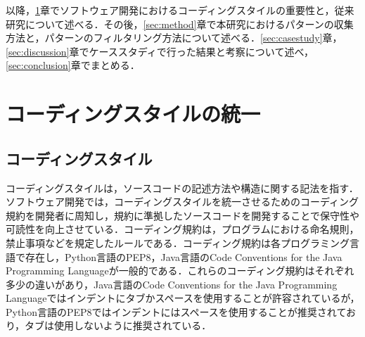 \documentclass[T,J]{fose} %
\begin{document}
以降，\ref{sec:union}章でソフトウェア開発におけるコーディングスタイルの重要性と，従来研究について述べる．その後，\ref{sec:method}章で本研究におけるパターンの収集方法と，パターンのフィルタリング方法について述べる．\ref{sec:casestudy}章，\ref{sec:discussion}章でケーススタディで行った結果と考察について述べ，\ref{sec:conclusion}章でまとめる．

\section{コーディングスタイルの統一}\label{sec:union}

\subsection{コーディングスタイル}
コーディングスタイルは，ソースコードの記述方法や構造に関する記法を指す．ソフトウェア開発では，コーディングスタイルを統一させるためのコーディング規約を開発者に周知し，規約に準拠したソースコードを開発することで保守性や可読性を向上させている．\cite{AnalysisoftheTools}コーディング規約は，プログラムにおける命名規則，禁止事項などを規定したルールである．コーディング規約は各プログラミング言語で存在し，Python言語のPEP8，Java言語のCode Conventions for the Java Programming Languageが一般的である．これらのコーディング規約はそれぞれ多少の違いがあり，Java言語のCode Conventions for the Java Programming Languageではインデントにタブかスペースを使用することが許容されているが，Python言語のPEP8ではインデントにはスペースを使用することが推奨されており，タブは使用しないように推奨されている．

\end{document}
